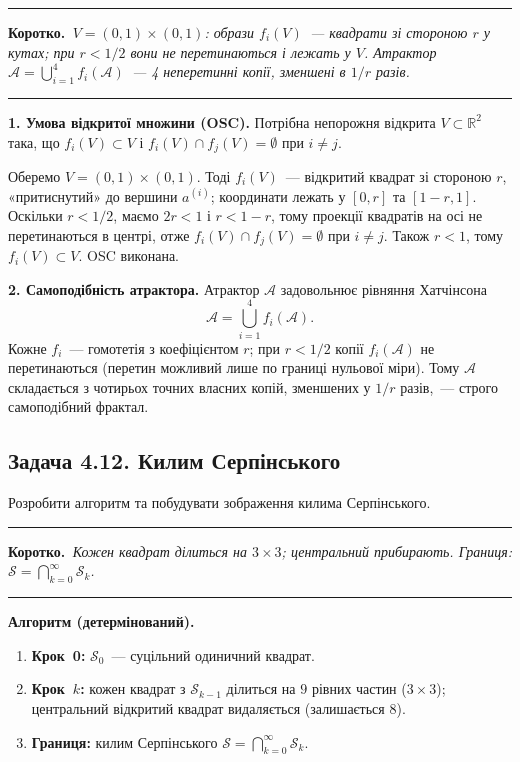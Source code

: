 \documentclass[12pt,a4paper]{article}
\newenvironment{korotko}
  {\par\medskip\noindent\begingroup\color{accent!75!black}\rule{\linewidth}{0.4pt}\par
   \noindent\textbf{Коротко.}\itshape\,}
  {\par\noindent\rule{\linewidth}{0.4pt}\endgroup\medskip}
\begin{document}
\begin{korotko}
$V=(0,1)\times(0,1)$: образи $f_i(V)$~--- квадрати зі стороною $r$ у кутах;
при $r<1/2$ вони не перетинаються і лежать у $V$. Атрактор
$\mathcal{A}=\bigcup_{i=1}^4 f_i(\mathcal{A})$~--- 4 неперетинні копії, зменшені в $1/r$ разів.
\end{korotko}

\textbf{1. Умова відкритої множини (OSC).}
Потрібна непорожня відкрита $V\subset\mathbb{R}^2$ така, що $f_i(V)\subset V$ і
$f_i(V)\cap f_j(V)=\emptyset$ при $i\neq j$.

Оберемо $V=(0,1)\times(0,1)$. Тоді $f_i(V)$~--- відкритий квадрат зі стороною $r$,
«притиснутий» до вершини $a^{(i)}$; координати лежать у $[0,r]$ та $[1-r,1]$.
Оскільки $r<1/2$, маємо $2r<1$ і $r<1-r$, тому проекції квадратів на осі не
перетинаються в центрі, отже $f_i(V)\cap f_j(V)=\emptyset$ при $i\neq j$.
Також $r<1$, тому $f_i(V)\subset V$. OSC виконана.

\textbf{2. Самоподібність атрактора.}
Атрактор $\mathcal{A}$ задовольнює рівняння Хатчінсона
\begin{equation*}
  \mathcal{A}=\bigcup_{i=1}^{4}f_i(\mathcal{A}).
\end{equation*}
Кожне $f_i$~--- гомотетія з коефіцієнтом $r$; при $r<1/2$ копії $f_i(\mathcal{A})$
не перетинаються (перетин можливий лише по границі нульової міри). Тому $\mathcal{A}$
складається з чотирьох точних власних копій, зменшених у $1/r$ разів,~--- строго
самоподібний фрактал.

\subsection{Задача 4.12. Килим Серпінського}
Розробити алгоритм та побудувати зображення килима Серпінського.

\begin{korotko}
Кожен квадрат ділиться на $3\times3$; центральний прибирають. Границя:
$\mathcal{S}=\bigcap_{k=0}^{\infty}\mathcal{S}_k$.
\end{korotko}

\textbf{Алгоритм (детермінований).}
\begin{enumerate}[leftmargin=1.6em,itemsep=0.25em]
  \item \textbf{Крок~0:} $\mathcal{S}_0$~--- суцільний одиничний квадрат.
  \item \textbf{Крок~$k$:} кожен квадрат з $\mathcal{S}_{k-1}$ ділиться на $9$ рівних
        частин ($3\times3$); центральний відкритий квадрат видаляється (залишається $8$).
  \item \textbf{Границя:} килим Серпінського $\mathcal{S}=\bigcap_{k=0}^{\infty}\mathcal{S}_k$.
\end{enumerate}
\end{document}
